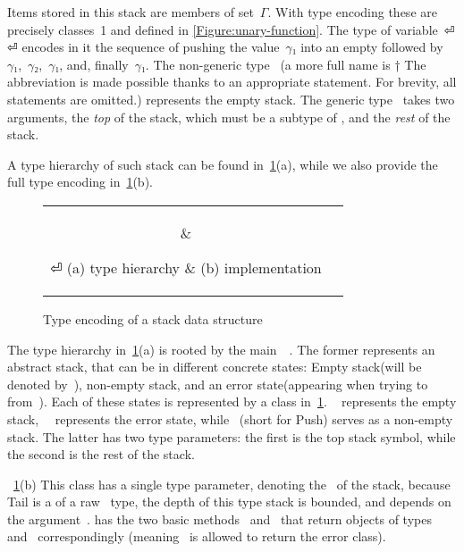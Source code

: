Items stored in this stack are members of set~$Γ$.
With type encoding these are precisely classes~1
  and  defined in \cref{Figure:unary-function}.
The type of variable~⏎
\mbox{\qquad\qquad}⏎
encodes in it the sequence of pushing the value~$γ₁$ into an
  empty followed by~$γ₁$,~$γ₂$,~$γ₁$, and, finally~$γ₁$.
  The non-generic type~ (a more full name is †{%
    The~ abbreviation is made possible
      thanks to an appropriate  statement.
      For brevity, all  statements are omitted.})
  represents the empty stack.
The generic type~ takes two arguments, the \emph{top} of the stack,
    which must be a subtype of , and the \emph{rest} of the stack.

A type hierarchy of such stack can be found in~\cref{Figure:stack:encoding}(a),
  while we also provide the full \Java type encoding in~\cref{Figure:stack:encoding}(b).

\begin{figure}[htb]
  \caption{\label{Figure:stack:encoding} Type encoding of a stack data structure}
    \begin{tabular}{cc}
      \hspace{-12ex}
      \parbox[c]{0.3\linewidth}{%
        
      }
      &
      \hspace{1ex}
      \parbox[c]{0.86\linewidth}{
    }%
⏎
      \hspace{-12ex} (a) type hierarchy & (b) implementation
    \end{tabular}
\end{figure}

The type hierarchy in~\cref{Figure:stack:encoding}(a) is rooted by the main~~.
The former represents an abstract stack, that can be in different concrete states: Empty stack(will be denoted by~),
  non-empty stack, and an error state(appearing when trying to~ from~).
Each of these states is represented by a class in~\cref{Figure:stack:encoding}.
~ represents the empty stack,~~ represents the error state,
  while ~(short for Push) serves as a non-empty stack.
The latter has two type parameters: the first is the top stack symbol, while the second is the rest of the stack.

~\cref{Figure:stack:encoding}(b) %
This class has a single type parameter, denoting the~ of the stack, because Tail is a
  of a raw~ type, the depth of this type stack is bounded, and depends on the argument~.
 has the two basic methods~ and~ that return objects of types~ and~
  correspondingly (meaning~ is allowed to return the error class).



